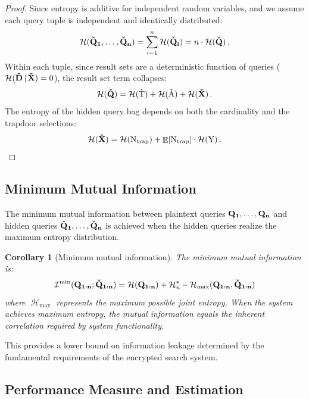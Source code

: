 \documentclass[final,11pt]{article}
\newcommand{\rvhrs}[1][]{%
   \ifthenelse{ \equal{#1}{} }
      {\ensuremath{\rv{\vec{\check{D}}}}}
      {\ensuremath{\rv{\vec{\check{D}_{#1}}}}}
}
\newcommand{\rvhqb}[1][]{%
   \ifthenelse{ \equal{#1}{} }
      {\ensuremath{\rv{\vec{\check{X}}}}}
      {\ensuremath{\rv{\vec{\check{X}_{#1}}}}}
}
\newcommand{\rvhts}[1][]{%
   \ifthenelse{ \equal{#1}{} }
      {\ensuremath{\rv{\check{T}}}}
      {\ensuremath{\rv{\check{T}_{#1}}}}
}
\newcommand{\rvhsa}[1][]{%
   \ifthenelse{ \equal{#1}{} }
      {\ensuremath{\rv{\check{A}}}}
      {\ensuremath{\rv{\check{A}_{#1}}}}
}
\newcommand{\rvhtup}[1][]{%
   \ifthenelse{ \equal{#1}{} }
      {\ensuremath{\rv{\vec{\check{Q}}}}}
      {\ensuremath{\rv{\vec{\check{Q}_{#1}}}}}
}
\newcommand{\rvtup}[1][]{%
   \ifthenelse{ \equal{#1}{} }
      {\ensuremath{\rv{\vec{Q}}}}
      {\ensuremath{\rv{\vec{Q_{#1}}}}}
}
\newcommand{\rv}[1]{\mathrm{#1}}
\newcommand{\entropy}{\operatorname{\mathcal{H}}}
\newcommand{\info}{\operatorname{\mathcal{I}}}
\newcommand{\given}{{\,|\,}}
\renewcommand{\vec}[1]{\boldsymbol{\mathbf{#1}}}
\DeclareMathOperator{\expectation}{\mathbb{E}}
\numberwithin{equation}{section}
\theoremstyle{plain}
\newtheorem{corollary}{Corollary}[theorem]
\theoremstyle{remark}
\begin{document}
\begin{proof}
Since entropy is additive for independent random variables, and we assume each query tuple is independent and identically distributed:
\begin{equation}
    \entropy(\rvhtup[1], \ldots, \rvhtup[n]) = \sum_{i=1}^n \entropy(\rvhtup[i]) = n \cdot \entropy(\rvhtup)\,.
\end{equation}
Within each tuple, since result sets are a deterministic function of queries
($\entropy(\rvhrs \given \rvhqb) = 0$), the result set term collapses:
\begin{equation}
    \entropy(\rvhtup) = \entropy(\rvhts) + \entropy(\rvhsa) + \entropy(\rvhqb)\,.
\end{equation}
The entropy of the hidden query bag depends on both the cardinality and the trapdoor selections:
\begin{equation}
    \entropy(\rvhqb) = \entropy(\rv{N_{\text{trap}}}) + \expectation[\rv{N_{\text{trap}}}] \cdot \entropy(\rv{Y})\,.
\end{equation}
\end{proof}

\subsection{Minimum Mutual Information}
The minimum mutual information between plaintext queries $\rvtup[1],\ldots,\rvtup[n]$ and hidden queries $\rvhtup[1],\ldots,\rvhtup[n]$ is achieved when the hidden queries realize the maximum entropy distribution.

\begin{corollary}[Minimum mutual information]
The minimum mutual information is:
\begin{equation}
    \info^{\min}(\rvtup[1:n] ; \rvhtup[1:n]) = \entropy(\rvtup[1:n]) + \entropy^*_n - \entropy_{\max}(\rvtup[1:n], \rvhtup[1:n])
\end{equation}
where $\entropy_{\max}$ represents the maximum possible joint entropy. When the system achieves maximum entropy, the mutual information equals the inherent correlation required by system functionality.
\end{corollary}

This provides a lower bound on information leakage determined by the fundamental requirements of the encrypted search system.

\subsection{Performance Measure and Estimation}
\end{document}
